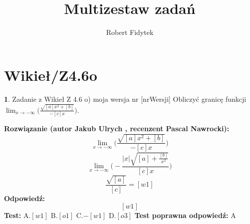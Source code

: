 \documentclass[12pt, a4paper]{article}
\title{Multizestaw zadań}
\author{Robert Fidytek}
\date{}
\theoremstyle{definition} %
\newtheorem{zad}{}
\newcommand{\kategoria}[1]{\section{#1}} %
\newcommand{\zadStart}[1]{\begin{zad}#1\newline} %
\newcommand{\zadStop}{\end{zad}}   %
\newcommand{\rozwStart}[2]{\noindent \textbf{Rozwiązanie (autor #1 , recenzent #2): }\newline} %
\newcommand{\rozwStop}{\newline}                                            %
\newcommand{\odpStart}{\noindent \textbf{Odpowiedź:}\newline}    %
\newcommand{\odpStop}{\newline}                                             %
\newcommand{\testStart}{\noindent \textbf{Test:}\newline} %
\newcommand{\testStop}{\newline} %
\newcommand{\kluczStart}{\noindent \textbf{Test poprawna odpowiedź:}\newline} %
\newcommand{\kluczStop}{\newline} %
\begin{document}
\maketitle


\kategoria{Wikieł/Z4.6o}
\zadStart{Zadanie z Wikieł Z 4.6 o) moja wersja nr [nrWersji]}
Obliczyć granicę funkcji $\lim_{x \to -\infty}\bigg(\frac{\sqrt{[a]x^{2}+[b]}}{-[c]x}\bigg)$.
\zadStop
\rozwStart{Jakub Ulrych}{Pascal Nawrocki}
$$\lim_{x \to -\infty}\bigg(\frac{\sqrt{[a]x^{2}+[b]}}{-[c]x}\bigg)$$
$$\lim_{x \to -\infty}\bigg(-\frac{|x|\sqrt{[a]+\frac{[b]}{x^{2}}}}{[c]x}\bigg)$$
$$\frac{\sqrt{[a]}}{[c]}=[w1]$$
\rozwStop
\odpStart
$$[w1]$$
\odpStop
\testStart
A.$[w1]$
B.$[o1]$
C.$-[w1]$
D.$[o3]$
\testStop
\kluczStart
A
\kluczStop
\end{document}
